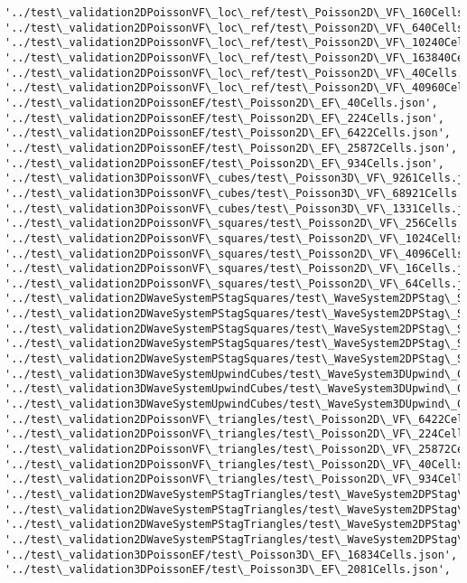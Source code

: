 \documentclass[11pt]{article}
\begin{document}
\begin{Verbatim}[commandchars=\\\{\}]
'../test\_validation2DPoissonVF\_loc\_ref/test\_Poisson2D\_VF\_160Cells.json', '../test\_validation2DPoissonVF\_loc\_ref/test\_Poisson2D\_VF\_640Cells.json', '../test\_validation2DPoissonVF\_loc\_ref/test\_Poisson2D\_VF\_10240Cells.json', '../test\_validation2DPoissonVF\_loc\_ref/test\_Poisson2D\_VF\_163840Cells.json', '../test\_validation2DPoissonVF\_loc\_ref/test\_Poisson2D\_VF\_40Cells.json', '../test\_validation2DPoissonVF\_loc\_ref/test\_Poisson2D\_VF\_40960Cells.json', '../test\_validation2DPoissonEF/test\_Poisson2D\_EF\_40Cells.json', '../test\_validation2DPoissonEF/test\_Poisson2D\_EF\_224Cells.json', '../test\_validation2DPoissonEF/test\_Poisson2D\_EF\_6422Cells.json', '../test\_validation2DPoissonEF/test\_Poisson2D\_EF\_25872Cells.json', '../test\_validation2DPoissonEF/test\_Poisson2D\_EF\_934Cells.json', '../test\_validation3DPoissonVF\_cubes/test\_Poisson3D\_VF\_9261Cells.json', '../test\_validation3DPoissonVF\_cubes/test\_Poisson3D\_VF\_68921Cells.json', '../test\_validation3DPoissonVF\_cubes/test\_Poisson3D\_VF\_1331Cells.json', '../test\_validation2DPoissonVF\_squares/test\_Poisson2D\_VF\_256Cells.json', '../test\_validation2DPoissonVF\_squares/test\_Poisson2D\_VF\_1024Cells.json', '../test\_validation2DPoissonVF\_squares/test\_Poisson2D\_VF\_4096Cells.json', '../test\_validation2DPoissonVF\_squares/test\_Poisson2D\_VF\_16Cells.json', '../test\_validation2DPoissonVF\_squares/test\_Poisson2D\_VF\_64Cells.json', '../test\_validation2DWaveSystemPStagSquares/test\_WaveSystem2DPStag\_SquareWithSquares64Cells.json', '../test\_validation2DWaveSystemPStagSquares/test\_WaveSystem2DPStag\_SquareWithSquares16Cells.json', '../test\_validation2DWaveSystemPStagSquares/test\_WaveSystem2DPStag\_SquareWithSquares256Cells.json', '../test\_validation2DWaveSystemPStagSquares/test\_WaveSystem2DPStag\_SquareWithSquares1024Cells.json', '../test\_validation2DWaveSystemPStagSquares/test\_WaveSystem2DPStag\_SquareWithSquares4096Cells.json', '../test\_validation3DWaveSystemUpwindCubes/test\_WaveSystem3DUpwind\_CubeWithCubes216Cells.json', '../test\_validation3DWaveSystemUpwindCubes/test\_WaveSystem3DUpwind\_CubeWithCubes9261Cells.json', '../test\_validation3DWaveSystemUpwindCubes/test\_WaveSystem3DUpwind\_CubeWithCubes1331Cells.json', '../test\_validation2DPoissonVF\_triangles/test\_Poisson2D\_VF\_6422Cells.json', '../test\_validation2DPoissonVF\_triangles/test\_Poisson2D\_VF\_224Cells.json', '../test\_validation2DPoissonVF\_triangles/test\_Poisson2D\_VF\_25872Cells.json', '../test\_validation2DPoissonVF\_triangles/test\_Poisson2D\_VF\_40Cells.json', '../test\_validation2DPoissonVF\_triangles/test\_Poisson2D\_VF\_934Cells.json', '../test\_validation2DWaveSystemPStagTriangles/test\_WaveSystem2DPStag\_SquareWithTriangles6422Cells.json', '../test\_validation2DWaveSystemPStagTriangles/test\_WaveSystem2DPStag\_SquareWithTriangles224Cells.json', '../test\_validation2DWaveSystemPStagTriangles/test\_WaveSystem2DPStag\_SquareWithTriangles40Cells.json', '../test\_validation2DWaveSystemPStagTriangles/test\_WaveSystem2DPStag\_SquareWithTriangles934Cells.json', '../test\_validation3DPoissonEF/test\_Poisson3D\_EF\_16834Cells.json', '../test\_validation3DPoissonEF/test\_Poisson3D\_EF\_2081Cells.json', 
\end{Verbatim}
\end{document}
